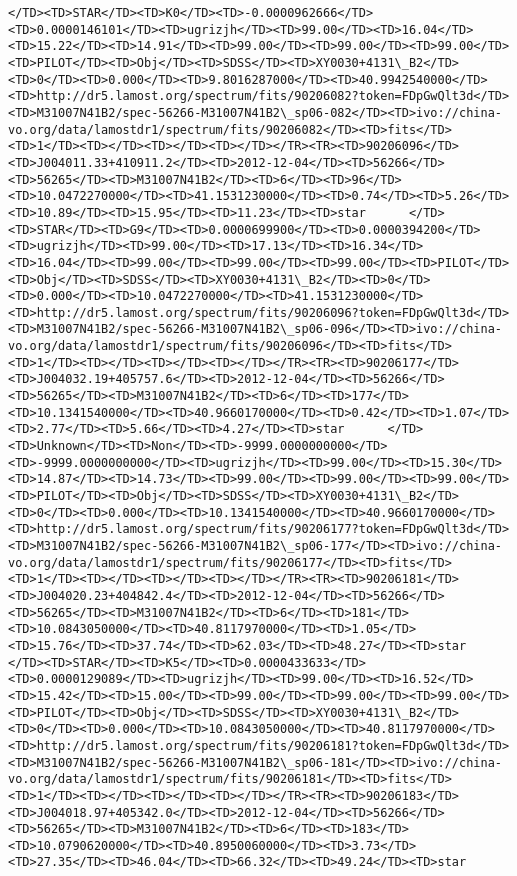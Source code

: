 \documentclass[11pt]{article}
\begin{document}
\begin{Verbatim}[commandchars=\\\{\}]
</TD><TD>STAR</TD><TD>K0</TD><TD>-0.0000962666</TD><TD>0.0000146101</TD><TD>ugrizjh</TD><TD>99.00</TD><TD>16.04</TD><TD>15.22</TD><TD>14.91</TD><TD>99.00</TD><TD>99.00</TD><TD>99.00</TD><TD>PILOT</TD><TD>Obj</TD><TD>SDSS</TD><TD>XY0030+4131\_B2</TD><TD>0</TD><TD>0.000</TD><TD>9.8016287000</TD><TD>40.9942540000</TD><TD>http://dr5.lamost.org/spectrum/fits/90206082?token=FDpGwQlt3d</TD><TD>M31007N41B2/spec-56266-M31007N41B2\_sp06-082</TD><TD>ivo://china-vo.org/data/lamostdr1/spectrum/fits/90206082</TD><TD>fits</TD><TD>1</TD><TD></TD><TD></TD><TD></TD></TR><TR><TD>90206096</TD><TD>J004011.33+410911.2</TD><TD>2012-12-04</TD><TD>56266</TD><TD>56265</TD><TD>M31007N41B2</TD><TD>6</TD><TD>96</TD><TD>10.0472270000</TD><TD>41.1531230000</TD><TD>0.74</TD><TD>5.26</TD><TD>10.89</TD><TD>15.95</TD><TD>11.23</TD><TD>star      </TD><TD>STAR</TD><TD>G9</TD><TD>0.0000699900</TD><TD>0.0000394200</TD><TD>ugrizjh</TD><TD>99.00</TD><TD>17.13</TD><TD>16.34</TD><TD>16.04</TD><TD>99.00</TD><TD>99.00</TD><TD>99.00</TD><TD>PILOT</TD><TD>Obj</TD><TD>SDSS</TD><TD>XY0030+4131\_B2</TD><TD>0</TD><TD>0.000</TD><TD>10.0472270000</TD><TD>41.1531230000</TD><TD>http://dr5.lamost.org/spectrum/fits/90206096?token=FDpGwQlt3d</TD><TD>M31007N41B2/spec-56266-M31007N41B2\_sp06-096</TD><TD>ivo://china-vo.org/data/lamostdr1/spectrum/fits/90206096</TD><TD>fits</TD><TD>1</TD><TD></TD><TD></TD><TD></TD></TR><TR><TD>90206177</TD><TD>J004032.19+405757.6</TD><TD>2012-12-04</TD><TD>56266</TD><TD>56265</TD><TD>M31007N41B2</TD><TD>6</TD><TD>177</TD><TD>10.1341540000</TD><TD>40.9660170000</TD><TD>0.42</TD><TD>1.07</TD><TD>2.77</TD><TD>5.66</TD><TD>4.27</TD><TD>star      </TD><TD>Unknown</TD><TD>Non</TD><TD>-9999.0000000000</TD><TD>-9999.0000000000</TD><TD>ugrizjh</TD><TD>99.00</TD><TD>15.30</TD><TD>14.87</TD><TD>14.73</TD><TD>99.00</TD><TD>99.00</TD><TD>99.00</TD><TD>PILOT</TD><TD>Obj</TD><TD>SDSS</TD><TD>XY0030+4131\_B2</TD><TD>0</TD><TD>0.000</TD><TD>10.1341540000</TD><TD>40.9660170000</TD><TD>http://dr5.lamost.org/spectrum/fits/90206177?token=FDpGwQlt3d</TD><TD>M31007N41B2/spec-56266-M31007N41B2\_sp06-177</TD><TD>ivo://china-vo.org/data/lamostdr1/spectrum/fits/90206177</TD><TD>fits</TD><TD>1</TD><TD></TD><TD></TD><TD></TD></TR><TR><TD>90206181</TD><TD>J004020.23+404842.4</TD><TD>2012-12-04</TD><TD>56266</TD><TD>56265</TD><TD>M31007N41B2</TD><TD>6</TD><TD>181</TD><TD>10.0843050000</TD><TD>40.8117970000</TD><TD>1.05</TD><TD>15.76</TD><TD>37.74</TD><TD>62.03</TD><TD>48.27</TD><TD>star      </TD><TD>STAR</TD><TD>K5</TD><TD>0.0000433633</TD><TD>0.0000129089</TD><TD>ugrizjh</TD><TD>99.00</TD><TD>16.52</TD><TD>15.42</TD><TD>15.00</TD><TD>99.00</TD><TD>99.00</TD><TD>99.00</TD><TD>PILOT</TD><TD>Obj</TD><TD>SDSS</TD><TD>XY0030+4131\_B2</TD><TD>0</TD><TD>0.000</TD><TD>10.0843050000</TD><TD>40.8117970000</TD><TD>http://dr5.lamost.org/spectrum/fits/90206181?token=FDpGwQlt3d</TD><TD>M31007N41B2/spec-56266-M31007N41B2\_sp06-181</TD><TD>ivo://china-vo.org/data/lamostdr1/spectrum/fits/90206181</TD><TD>fits</TD><TD>1</TD><TD></TD><TD></TD><TD></TD></TR><TR><TD>90206183</TD><TD>J004018.97+405342.0</TD><TD>2012-12-04</TD><TD>56266</TD><TD>56265</TD><TD>M31007N41B2</TD><TD>6</TD><TD>183</TD><TD>10.0790620000</TD><TD>40.8950060000</TD><TD>3.73</TD><TD>27.35</TD><TD>46.04</TD><TD>66.32</TD><TD>49.24</TD><TD>star  
\end{Verbatim}
\end{document}
